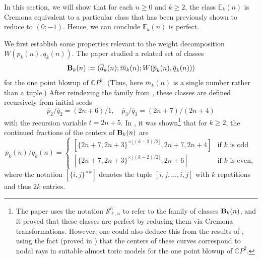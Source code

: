\documentclass[11pt, reqno]{amsart}
\theoremstyle{remark}
\numberwithin{equation}{subsection}
\numberwithin{figure}{section}
\theoremstyle{customremark}
\newcommand{\Ss}{{\mathcal S}}
\newcommand{\bE}{{\mathbb E}}
\newcommand{\ov}{\overline}
\newcommand{\C}{\mathbb{C}}
\newcommand{\comm}[1]{\marginpar{\tiny #1 }}
\newcommand{\bB}{{\bf{B}}}
\begin{document}
 In this section, we will show that for each $n \geq 0$ and $k \geq 2$, the class $\bE_k(n)$ is Cremona equivalent to a particular class that has been previously shown to reduce to $(0;-1).$ Hence, we can conclude $\bE_k(n)$ is perfect. 


We first establish some properties relevant to the weight decomposition $W(p_k(n),q_k(n)).$
The paper \cite{BHM} studied a related set of classes 
\[\bB_k(n):=(\ov{d}_k(n);\ov{m}_k(n);W(\ov{p}_k(n),\ov{q}_k(n))) \]
for the one point blowup of $\C P^2$.  (Thus, here $\ov{m}_k(n)$ is a single number rather than a tuple.)  
After reindexing the family from \cite{BHM}, these
classes are defined recursively from initial seeds $$
\ov{p}_2/\ov{q}_2 = (2n+6)/1, \quad \ov{p}_3/\ov{q}_3 = (2n+7)/(2n+4)
$$ 
with the recursion variable $t = 2n+5$.
In \cite[Theorem 56]{BHM}, it was shown\footnote{The paper \cite{BHM} uses the notation $\Ss^U_{\ell,n}$ to refer to the family of classes $\bB_k(n)$, and it proved that these classes are perfect by reducing them via Cremona transformations. However, one could also deduce this from the results of \cite{McSie}, using the fact (proved in \cite{MMW}) that the centers of these curves correspond to nodal rays in suitable almost toric models for the  one point blowup of $\C P^2$.} that for $ k \geq 2$, the continued fractions of the centers of $\bB_k(n)$ are 
\begin{equation} \label{eq:CFBnk}
\ov{p}_k(n)/\ov{q}_k(n)=\begin{cases}
  [\{2n+7,2n+3\}^{\times \lfloor(k-2)/2\rfloor},2n+7,2n+4] & \text{if $k$ is odd} \\
[\{2n+7,2n+3\}^{\times\lfloor (k-2)/2\rfloor},2n+6] & \text{if $k$ is even},
    \end{cases}
\end{equation}
where the notation $[\{i,j\}^{\times k}]$ denotes the tuple $ [i,j,\dots,i,j]$ with $k$ repetitions and thus $2k$ entries.
\end{document}
